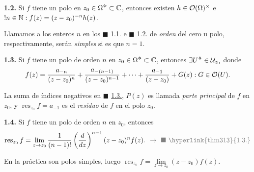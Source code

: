 \hypertarget{thm312}{}
\begin{theorem}
    \textbf{1.2.} Si \(f\) tiene un polo en \(z_0\in \Omega\ab \subset \C\), entonces existen \(h \in \mathcal{O}(\Omega)^\times\) e \(!n \in \mathbb{N} :  f(z ) = (z-z_0)^{-n} h(z)\).   
\end{theorem}

\begin{note}
    Llamamos a los enteros \(n\) en los \(\blacksquare\) \hyperlink{thm311}{1.1.} e \(\blacksquare\) \hyperlink{thm312}{1.2.} de \emph{orden} del cero u polo, respectivamente, serán \emph{simples} si es que \(n =1 \).
\end{note}

\hypertarget{thm313}{}
\begin{theorem}
    \textbf{1.3.} Si \(f\) tiene un polo de orden \(n \) en \(z_0 \in \Omega\ab \subset \C\), entonces \(\exists U\ab \in \U_{z_0}\) donde
    \[f(z) = \frac{a_{-n}}{(z-z_0)^n} + \frac{a_{-(n-1)}}{(z-z_0)^{n-1}} + \cdots + \frac{a_{-1}}{(z-z_0)}+ G(z): G \in \mathcal{O}(U).\]
\end{theorem}

\demo{\[f(z) = (z-z_0)^{-n} h(z) = (z-z_0)^{-n} \sum_{k=0}^\infty a_k (z-z_0)^k, \ \ \blacksquare \ \text{\hyperlink{thm312}{1.2.}}.\]
\vspace{-0.2cm}
} 

\begin{note}
    La suma de índices negativos en \(\blacksquare\) \hyperlink{thm313}{1.3.}, \(P(z)\) es llamada \emph{parte principal} de \(f\) en \(z_0\), y \(\operatorname{res}_{z_0}f = a_{-1}\) es el \emph{residuo} de \(f\) en el polo \(z_0\). 
\end{note}

\begin{theorem}
    \textbf{1.4.} Si \(f\) tiene un polo de orden \(n\) en \(z_0\), entonces 
    \[\operatorname{res}_{z_0}f = \lim_{z\to z_0} \frac{1}{(n-1)!} \left(\frac{d}{dz}\right)^{n-1} (z-z_0)^nf(z). \textcolor{gray}{ \ \ \rightarrow \ \blacksquare \ \text{\hyperlink{thm313}{1.3.}}}\]   
\end{theorem}

\vspace{-0.2cm}
\begin{note}
    En la práctica son polos simples, luego \(\operatorname{res}_{z_0}f = \underset{z\to z_0}{\lim}(z-z_0) f(z)\). 
\end{note}

